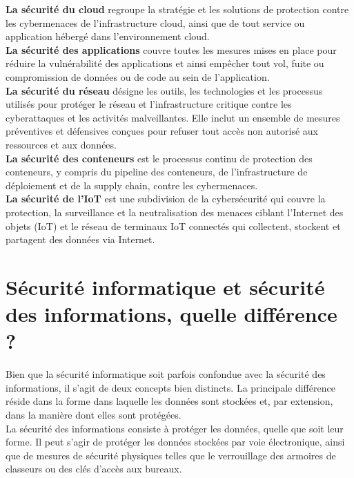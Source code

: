  \textbf{La sécurité du cloud} regroupe la stratégie et les solutions de protection contre les cybermenaces de l’infrastructure cloud, ainsi que de tout service ou application hébergé dans l’environnement cloud.\\
 
 \textbf{La sécurité des applications} couvre toutes les mesures mises en place pour réduire la vulnérabilité des applications et ainsi empêcher tout vol, fuite ou compromission de données ou de code au sein de l’application.\\
 
 \textbf{La sécurité du réseau }désigne les outils, les technologies et les processus utilisés pour protéger le réseau et l’infrastructure critique contre les cyberattaques et les activités malveillantes. Elle inclut un ensemble de mesures préventives et défensives conçues pour refuser tout accès non autorisé aux ressources et aux données.\\
 
 \textbf{La sécurité des conteneurs} est le processus continu de protection des conteneurs, y compris du pipeline des conteneurs, de l’infrastructure de déploiement et de la supply chain, contre les cybermenaces.\\
 
 \textbf{La sécurité de l’IoT} est une subdivision de la cybersécurité qui couvre la protection, la surveillance et la neutralisation des menaces ciblant l’Internet des objets (IoT) et le réseau de terminaux IoT connectés qui collectent, stockent et partagent des données via Internet.\\
 \section{Sécurité informatique et sécurité des informations, quelle différence ?}
 
 Bien que la sécurité informatique soit parfois confondue avec la sécurité des informations, il s’agit de deux concepts bien distincts. La principale différence réside dans la forme dans laquelle les données sont stockées et, par extension, dans la manière dont elles sont protégées.\\
 
 La sécurité des informations consiste à protéger les données, quelle que soit leur forme. Il peut s’agir de protéger les données stockées par voie électronique, ainsi que de mesures de sécurité physiques telles que le verrouillage des armoires de classeurs ou des clés d’accès aux bureaux.\\
 
